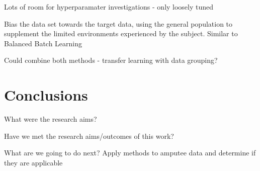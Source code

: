Lots of room for hyperparamater investigations - only loosely tuned


Bias the data set towards the target data, using the general population to supplement the limited environments experienced by the subject. Similar to Balanced Batch Learning \cite{Cruciani2020}

Could combine both methods - transfer learning with data grouping?
\section{Conclusions}
\label{sec:personalisation-conclusions}
What were the research aims?

Have we met the research aims/outcomes of this work?

What are we going to do next? Apply methods to amputee data and determine if they are applicable